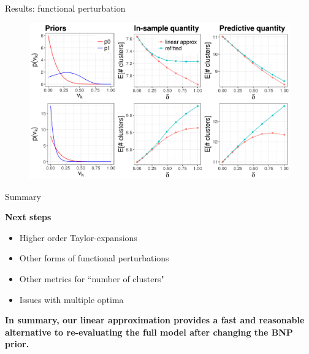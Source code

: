 \documentclass[10pt]{beamer}\usepackage[]{graphicx}\usepackage[]{color}
\newenvironment{knitrout}{}{} %
\begin{document}
% 

\begin{frame}{Results: functional perturbation}
\begin{figure}
\centering

\begin{knitrout}
\color{fgcolor}

{\centering \includegraphics[width=0.98\linewidth,height=0.588\linewidth]{figure/functional_sens_plot_thresh0-1} 

}



\end{knitrout}
\end{figure}

\end{frame}


\begin{frame}{Summary}

{\bf Next steps}
\begin{itemize}
\item Higher order Taylor-expansions
\pause 
\item Other forms of functional perturbations
\pause 
\item Other metrics for ``number of clusters"
\pause
\item Issues with multiple optima
\pause 
\end{itemize}
\vspace{0.2in}

\begin{mdframed}[style=MyFrame]
\begin{center}
{\bf In summary, our linear approximation provides a fast and reasonable alternative to re-evaluating the full model after changing the BNP prior.}
\end{center}
\end{mdframed}

\end{frame}
\end{document}
